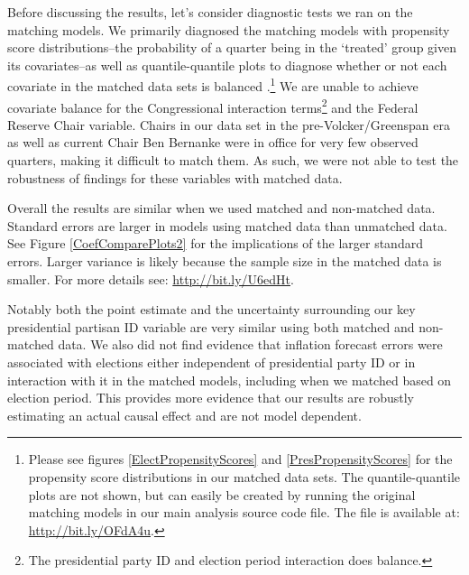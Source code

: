 \documentclass[a4paper]{article}
\begin{document}
Before discussing the results, let's consider diagnostic tests we ran on the matching models. We primarily diagnosed the matching models with propensity score distributions--the probability of a quarter being in the `treated' group given its covariates--as well as quantile-quantile plots to diagnose whether or not each covariate in the matched data sets is balanced \citep{Ho2007}.\footnote{Please see figures \ref{ElectPropensityScores} and \ref{PresPropensityScores} for the propensity score distributions in our matched data sets. The quantile-quantile plots are not shown, but can easily be created by running the original matching models in our main analysis source code file. The file is available at: \url{http://bit.ly/OFdA4u}.}  We are unable to achieve covariate balance for the Congressional interaction terms\footnote{The presidential party ID and election period interaction does balance.} and the Federal Reserve Chair variable. Chairs in our data set in the pre-Volcker/Greenspan era as well as current Chair Ben Bernanke were in office for very few observed quarters, making it difficult to match them. As such, we were not able to test the robustness of findings for these variables with matched data.

Overall the results are similar when we used matched and non-matched data. Standard errors are larger in models using matched data than unmatched data. See Figure \ref{CoefComparePlots2} for the implications of the larger standard errors. Larger variance is likely because the sample size in the matched data is smaller. For more details see: \url{http://bit.ly/U6edHt}. 

Notably both the point estimate and the uncertainty surrounding our key presidential partisan ID variable are very similar using both matched and non-matched data. We also did not find evidence that inflation forecast errors were associated with elections either independent of presidential party ID or in interaction with it in the matched models, including when we matched based on election period. This provides more evidence that our results are robustly estimating an actual causal effect and are not model dependent. 

\end{document}
